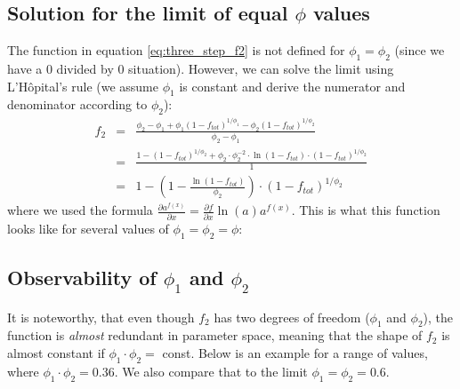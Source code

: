 \documentclass{article}
\begin{document}
\subsection{Solution for the limit of equal \texorpdfstring{$\phi$}{phi} values}
The function in equation \ref{eq:three_step_f2} is not defined for $\phi_1 = \phi_2$ (since we have a 0 divided by 0 situation). However, we can solve the limit using L'H\^{o}pital's rule (we assume $\phi_1$ is constant and derive the numerator and denominator according to $\phi_2$):
\begin{eqnarray}
	f_2 &=& 
	\frac{\phi_2 - \phi_1 + \phi_1 (1-f_{tot})^{1/{\phi_1}} - \phi_2 (1-f_{tot})^{1/{\phi_2}}}{\phi_2 - \phi_1}
	\nonumber\\
	&=& \frac{1 - (1-f_{tot})^{1/{\phi_2}} + \phi_2 \cdot \phi_2^{-2} \cdot \ln{(1-f_{tot})} \cdot(1-f_{tot})^{1/{\phi_2}}}{1}
	\nonumber\\
	&=& 1 - \left(1 - \frac{\ln{(1-f_{tot})}}{\phi_2} \right) \cdot (1-f_{tot})^{1/{\phi_2}}
\end{eqnarray}
where we used the formula $\frac{\partial a^{f(x)}}{\partial x} = \frac{\partial f}{\partial x}\ln(a) a^{f(x)}$. This is what this function looks like for several values of $\phi_1 = \phi_2 = \phi$:
\begin{center}
\end{center}

\subsection{Observability of \texorpdfstring{$\phi_1$}{phi1} and \texorpdfstring{$\phi_2$}{phi2}}
It is noteworthy, that even though $f_2$ has two degrees of freedom ($\phi_1$ and $\phi_2$), the function is \textit{almost} redundant in parameter space, meaning that the shape of $f_2$ is almost constant if $\phi_1 \cdot \phi_2 =$ const. Below is an example for a range of values, where $\phi_1 \cdot \phi_2 = 0.36$. We also compare that to the limit $\phi_1 = \phi_2 = 0.6$.
\end{document}
